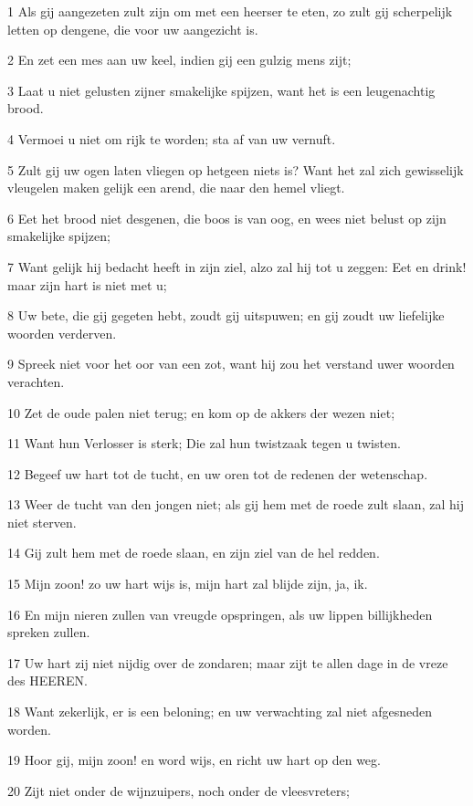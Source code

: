 \par 1 Als gij aangezeten zult zijn om met een heerser te eten, zo zult gij scherpelijk letten op dengene, die voor uw aangezicht is.
\par 2 En zet een mes aan uw keel, indien gij een gulzig mens zijt;
\par 3 Laat u niet gelusten zijner smakelijke spijzen, want het is een leugenachtig brood.
\par 4 Vermoei u niet om rijk te worden; sta af van uw vernuft.
\par 5 Zult gij uw ogen laten vliegen op hetgeen niets is? Want het zal zich gewisselijk vleugelen maken gelijk een arend, die naar den hemel vliegt.
\par 6 Eet het brood niet desgenen, die boos is van oog, en wees niet belust op zijn smakelijke spijzen;
\par 7 Want gelijk hij bedacht heeft in zijn ziel, alzo zal hij tot u zeggen: Eet en drink! maar zijn hart is niet met u;
\par 8 Uw bete, die gij gegeten hebt, zoudt gij uitspuwen; en gij zoudt uw liefelijke woorden verderven.
\par 9 Spreek niet voor het oor van een zot, want hij zou het verstand uwer woorden verachten.
\par 10 Zet de oude palen niet terug; en kom op de akkers der wezen niet;
\par 11 Want hun Verlosser is sterk; Die zal hun twistzaak tegen u twisten.
\par 12 Begeef uw hart tot de tucht, en uw oren tot de redenen der wetenschap.
\par 13 Weer de tucht van den jongen niet; als gij hem met de roede zult slaan, zal hij niet sterven.
\par 14 Gij zult hem met de roede slaan, en zijn ziel van de hel redden.
\par 15 Mijn zoon! zo uw hart wijs is, mijn hart zal blijde zijn, ja, ik.
\par 16 En mijn nieren zullen van vreugde opspringen, als uw lippen billijkheden spreken zullen.
\par 17 Uw hart zij niet nijdig over de zondaren; maar zijt te allen dage in de vreze des HEEREN.
\par 18 Want zekerlijk, er is een beloning; en uw verwachting zal niet afgesneden worden.
\par 19 Hoor gij, mijn zoon! en word wijs, en richt uw hart op den weg.
\par 20 Zijt niet onder de wijnzuipers, noch onder de vleesvreters;
